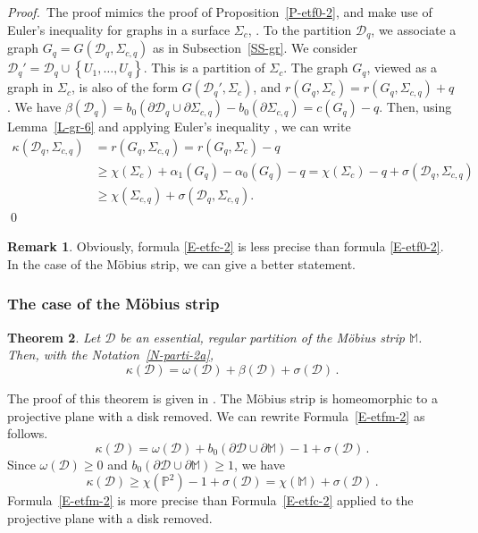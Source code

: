 \documentclass[12pt,a4paper]{amsart}
\theoremstyle{plain} %
\newtheorem{theorem}{Theorem}[section]
\theoremstyle{definition}
\newtheorem{remark}[theorem]{Remark}
\numberwithin{equation}{section}
\numberwithin{figure}{section}
\numberwithin{table}{section}
\newcommand{\M}{\mathbb{M}}
\newcommand{\cD}{\mathcal{D}}
\newcommand{\pf}{\emph{Proof.~}}
\newcommand{\set}[1]{\left\lbrace #1 \right\rbrace}
\newcommand{\rP}{\mathbb{P}^2}%
\newcommand{\bD}{\partial \cD}
\begin{document}
\pf The proof mimics the proof of Proposition~\ref{P-etf0-2}, and make use of Euler's inequality for graphs in a surface $\Sigma_c$, \cite[Corollary~9.27]{Gibl2010}. To the partition $\cD_q$, we associate a graph $G_q = G(\cD_q,\Sigma_{c,q})$ as in Subsection~\ref{SS-gr}. We consider $\cD_q' = \cD_q \cup \set{U_1,\ldots, U_q}$. This is a partition of $\Sigma_c$. The graph $G_q$, viewed as a graph in $\Sigma_c$, is also of the form $G(\cD_q',\Sigma_c)$, and $r(G_q,\Sigma_c) = r(G_q,\Sigma_{c,q}) + q$. We have $\beta(\cD_q) = b_0(\bD_q \cup \partial \Sigma_{c,q}) - b_0(\partial \Sigma_{c,q}) = c(G_q) - q$. Then, using Lemma~\ref{L-gr-6} and applying Euler's inequality \cite[Corollary~9.27]{Gibl2010}, we can write
%
\begin{equation*}
\begin{split}
\kappa(\cD_q,\Sigma_{c,q}) & = r(G_q,\Sigma_{c,q}) = r(G_q,\Sigma_{c}) - q\\[5pt]
& \ge \chi(\Sigma_c) + \alpha_1(G_q) - \alpha_0(G_q)  - q = \chi(\Sigma_c) - q + \sigma(\cD_q,\Sigma_{c,q})\\[5pt]
& \ge \chi(\Sigma_{c,q}) + \sigma(\cD_q,\Sigma_{c,q}).
\end{split}%
\end{equation*}
\hfill \qed


\begin{remark}\label{R-etfc-2P}
Obviously, formula \eqref{E-etfc-2} is less precise than formula \eqref{E-etf0-2}. In the case of the M\"{o}bius strip, we can give a better statement.
\end{remark}%


\subsubsection{The case of the M\"{o}bius strip}\label{SS-etfm}

\begin{theorem}\label{T-etfm-2}
Let $\cD$ be an  essential, regular partition of the M\"{o}bius strip $\M$.
Then, with the Notation~\ref{N-parti-2a},
%
\begin{equation}\label{E-etfm-2}
\kappa(\cD) = \omega(\cD) + \beta(\cD) + \sigma(\cD)\,.
\end{equation}
\end{theorem}

The proof of this theorem is given in \cite{BeHe2020m}. The M\"{o}bius strip is homeomorphic to a projective plane with a disk removed. We can rewrite Formula~\ref{E-etfm-2} as follows.
%
\begin{equation*}
\kappa(\cD) = \omega(\cD) + b_0(\bD \cup \partial \M) - 1 + \sigma(\cD)\,.
\end{equation*}
%
Since $\omega(\cD) \ge 0$ and $b_0(\bD \cup \partial \M) \ge 1$, we have
%
\begin{equation*}
\kappa(\cD) \ge \chi(\rP) - 1 + \sigma(\cD) = \chi(\M) + \sigma(\cD)\,.
\end{equation*}
%
Formula~\ref{E-etfm-2} is more precise than Formula~\ref{E-etfc-2} applied to the projective plane with a disk removed.
\end{document}
